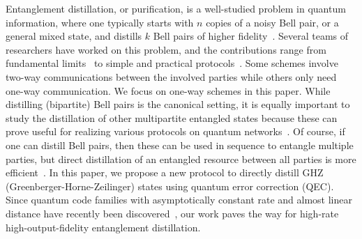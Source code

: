 \documentclass[journal,onecolumn]{IEEEtran}
\begin{document}
Entanglement distillation, or purification, is a well-studied problem in quantum information, where 
one typically starts with $n$ copies of a noisy Bell pair, or a general mixed state, and distills $k$ Bell pairs of higher fidelity~\cite{Bennett-prl96}.
Several teams of researchers have worked on this problem, and the contributions range from fundamental limits~\cite{Bennett-prl96,Bennett-pra96,Miyake-prl05,Dur-rpp07,Leditzky-it17,Fang-it19} to simple and practical protocols~\cite{Bennett-pra96,Wilde-isit10,Rozpedek-pra18,Krastanov-quantum19}. 
Some schemes involve two-way communications between the involved parties while others only need one-way communication.
We focus on one-way schemes in this paper.
While distilling (bipartite) Bell pairs is the canonical setting, it is equally important to study the distillation of other multipartite entangled states because these can prove useful for realizing various protocols on quantum networks~\cite{Dur-pra99}.
Of course, if one can distill Bell pairs, then these can be used in sequence to entangle multiple parties, but direct distillation of an entangled resource between all parties is more efficient~\cite{Murao-pra98}.
In this paper, we propose a new protocol to directly distill GHZ (Greenberger-Horne-Zeilinger) states using quantum error correction (QEC).
Since quantum code families with asymptotically constant rate and almost linear distance have recently been discovered~\cite{Hastings-stoc21,Panteleev-arxiv20,Breuckmann-it21,Breuckmann-arxiv21}, our work paves the way for high-rate high-output-fidelity entanglement distillation.
\end{document}
